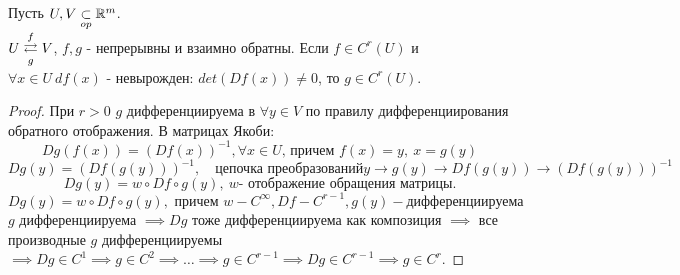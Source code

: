\begin{theorem}
    Пусть $U, V \underset{op}{\subset} \mathbb{R}^m$. \\
    $U \overunderset{f}{g}{\rightleftarrows} V$, $f, g$ - непрерывны и взаимно обратны. Если $f \in C^r(U)$ и $\forall x \in U \ df(x)$ - невырожден: $det(Df(x)) \neq 0$, то $g \in C^r(U)$.
    \begin{proof}
        При $r > 0$  $g$ дифференциируема в $\forall y \in V$ по правилу дифференциирования обратного отображения. В матрицах Якоби:
        \[Dg(f(x)) = (Df(x))^{-1}, \forall x \in U \text{, причем } f(x) = y, \ x = g(y)\]
        \[Dg(y) = (Df(g(y)))^{-1}, \quad \text{цепочка преобразований} y \to g(y) \to Df(g(y)) \to (Df(g(y)))^{-1}\]
        \[Dg(y) = w \circ Df \circ g(y), \ w \text{- отображение обращения матрицы.}\]
        \[Dg(y) = w \circ Df \circ g(y), \text{ причем } w - C^{\infty}, Df - C^{r-1}, g(y) - \text{дифференциируема}\]
        $g$ дифференциируема $\implies Dg$ тоже дифференциируема как композиция $\implies$ все производные $g$ дифференциируемы $\implies Dg \in C^1 \implies g \in C^2 \implies \hdots \implies g \in C^{r-1} \implies Dg \in C^{r-1} \implies g \in C^r$.
    \end{proof} 
\end{theorem}